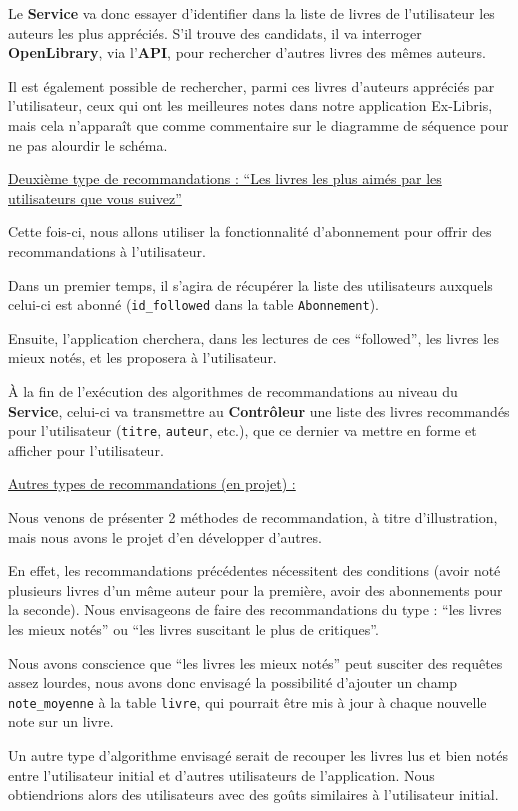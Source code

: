 \documentclass[
  letterpaper,
  DIV=11,
  numbers=noendperiod]{scrartcl}
\begin{document}
Le \textbf{Service} va donc essayer d'identifier dans la liste de livres
de l'utilisateur les auteurs les plus appréciés. S'il trouve des
candidats, il va interroger \textbf{OpenLibrary}, via l'\textbf{API},
pour rechercher d'autres livres des mêmes auteurs.

Il est également possible de rechercher, parmi ces livres d'auteurs
appréciés par l'utilisateur, ceux qui ont les meilleures notes dans
notre application Ex-Libris, mais cela n'apparaît que comme commentaire
sur le diagramme de séquence pour ne pas alourdir le schéma.

\ul{Deuxième type de recommandations : ``Les livres les plus aimés par
les utilisateurs que vous suivez''}

Cette fois-ci, nous allons utiliser la fonctionnalité d'abonnement pour
offrir des recommandations à l'utilisateur.

Dans un premier temps, il s'agira de récupérer la liste des utilisateurs
auxquels celui-ci est abonné (\texttt{id\_followed} dans la table
\texttt{Abonnement}).

Ensuite, l'application cherchera, dans les lectures de ces ``followed'',
les livres les mieux notés, et les proposera à l'utilisateur.

À la fin de l'exécution des algorithmes de recommandations au niveau du
\textbf{Service}, celui-ci va transmettre au \textbf{Contrôleur} une
liste des livres recommandés pour l'utilisateur (\texttt{titre},
\texttt{auteur}, etc.), que ce dernier va mettre en forme et afficher
pour l'utilisateur.

\ul{Autres types de recommandations (en projet) :}

Nous venons de présenter 2 méthodes de recommandation, à titre
d'illustration, mais nous avons le projet d'en développer d'autres.

En effet, les recommandations précédentes nécessitent des conditions
(avoir noté plusieurs livres d'un même auteur pour la première, avoir
des abonnements pour la seconde). Nous envisageons de faire des
recommandations du type : ``les livres les mieux notés'' ou ``les livres
suscitant le plus de critiques''.

Nous avons conscience que ``les livres les mieux notés'' peut susciter
des requêtes assez lourdes, nous avons donc envisagé la possibilité
d'ajouter un champ \texttt{note\_moyenne} à la table \texttt{livre}, qui
pourrait être mis à jour à chaque nouvelle note sur un livre.

Un autre type d'algorithme envisagé serait de recouper les livres lus et
bien notés entre l'utilisateur initial et d'autres utilisateurs de
l'application. Nous obtiendrions alors des utilisateurs avec des goûts
similaires à l'utilisateur initial.
\end{document}
